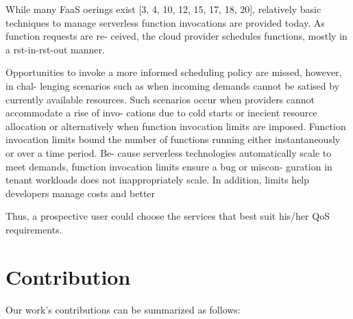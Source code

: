 \documentclass[12pt,a4paper]{report}
\theoremstyle{definition}
\begin{document}
While many FaaS oerings exist [3, 4, 10, 12, 15, 17, 18, 20],
relatively basic techniques to manage serverless function
invocations are provided today. As function requests are re-
ceived, the cloud provider schedules functions, mostly in
a rst-in-rst-out manner. 


Opportunities to invoke a more
informed scheduling policy are missed, however, in chal-
lenging scenarios such as when incoming demands cannot
be satised by currently available resources. Such scenarios
occur when providers cannot accommodate a rise of invo-
cations due to cold starts or inecient resource allocation
or alternatively when function invocation limits are imposed.
Function invocation limits bound the number of functions
running either instantaneously or over a time period. Be-
cause serverless technologies automatically scale to meet
demands, function invocation limits ensure a bug or miscon-
guration in tenant workloads does not inappropriately scale.
In addition, limits help developers manage costs and better


Thus, a prospective user
could choose the services that best suit his/her QoS
requirements.

\section{Contribution}

Our work's contributions can be summarized as follows:
\end{document}
